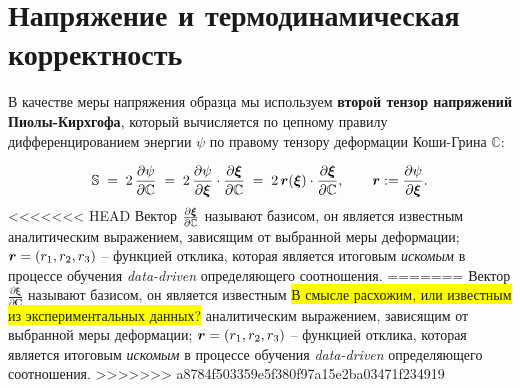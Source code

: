 \section{Напряжение и термодинамическая корректность}

В качестве меры напряжения образца мы используем \textbf{второй тензор напряжений Пиолы-Кирхгофа}, который вычисляется по цепному правилу дифференцированием энергии \(\psi\) 
по правому тензору деформации Коши-Грина \(\mathbb C\):

\begin{equation}
  \mathbb{S} \;=\; 2\,\frac{\partial \psi}{\partial \mathbb{C}}
  \;=\; 2\,\frac{\partial \psi}{\partial \boldsymbol{\xi}} \cdot \frac{\partial \boldsymbol{\xi}}{\partial \mathbb{C}}
  \;=\; 2\,\boldsymbol{r}(\boldsymbol{\xi})\cdot\frac{\partial \boldsymbol{\xi}}{\partial \mathbb{C}},
  \qquad \boldsymbol{r}:=\frac{\partial \psi}{\partial \boldsymbol{\xi}}.
  \label{eq:chain-rule}
\end{equation}
<<<<<<< HEAD
Вектор $\frac{\partial \boldsymbol{\xi}}{\partial \mathbb{C}}$ называют базисом, он является известным аналитическим выражением, зависящим от выбранной меры деформации; $\boldsymbol{r} = (r_1, r_2, r_3)$ -- функцией отклика, которая является итоговым \textit{искомым} в процессе обучения \textit{data-driven} определяющего соотношения.   
=======
Вектор $\frac{\partial \boldsymbol\xi}{\partial \mathbf{C}}$ называют базисом, он является известным \colorbox{yellow}{В смысле расхожим, или известным из экспериментальных данных?} аналитическим выражением, зависящим от выбранной меры деформации; $\boldsymbol{r} = (r_1, r_2, r_3)$ -- функцией отклика, которая является итоговым \textit{искомым} в процессе обучения \textit{data-driven} определяющего соотношения.   
>>>>>>> a8784f503359e5f380f97a15e2ba03471f234919

